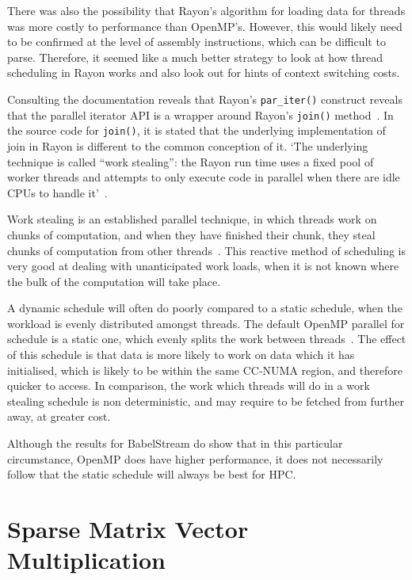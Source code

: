 There was also the possibility that Rayon's algorithm for loading data for threads was more costly to performance than OpenMP's. However, this would likely need to be confirmed at the level of assembly instructions, which can be difficult to parse. Therefore, it seemed like a much better strategy to look at how thread scheduling in Rayon works  and also look out for hints of context switching costs.

Consulting the documentation reveals that Rayon's \texttt{par\_iter()} construct reveals that the parallel iterator API is a wrapper around Rayon's \texttt{join()} method~\cite{smallCult}. In the source code for \texttt{join()}, it is stated that the underlying implementation of join in Rayon is different to the common conception of it. 
`The underlying technique is called ``work stealing'': the
Rayon run time uses a fixed pool of worker threads and attempts to only execute code in parallel when there are idle CPUs to handle it'~\cite{joinSrc}.

Work stealing is an established parallel technique, in which threads work on chunks of computation, and when they have finished their chunk, they steal chunks of computation from other threads~\cite{blumofe1999}. This reactive method of scheduling is very good at dealing with unanticipated work loads, when it is not known where the bulk of the computation will take place.

A dynamic schedule will often do poorly compared to a static schedule, when the workload is evenly distributed amongst threads. The default OpenMP parallel for schedule is a static one, which evenly splits the work between threads~\cite{OpenMPSpec5}. The effect of this schedule is that data is more likely to work on data which it has initialised, which is likely to be within the same CC-NUMA region, and therefore quicker to access. In comparison, the work which threads will do in a work stealing schedule is non deterministic, and may require to be fetched from further away, at greater cost.

Although the results for BabelStream do show that in this particular circumstance, OpenMP does have higher performance, it does not necessarily follow that the static schedule will always be best for HPC\@.

\section{Sparse Matrix Vector Multiplication}\label{sec:res-sparse}

